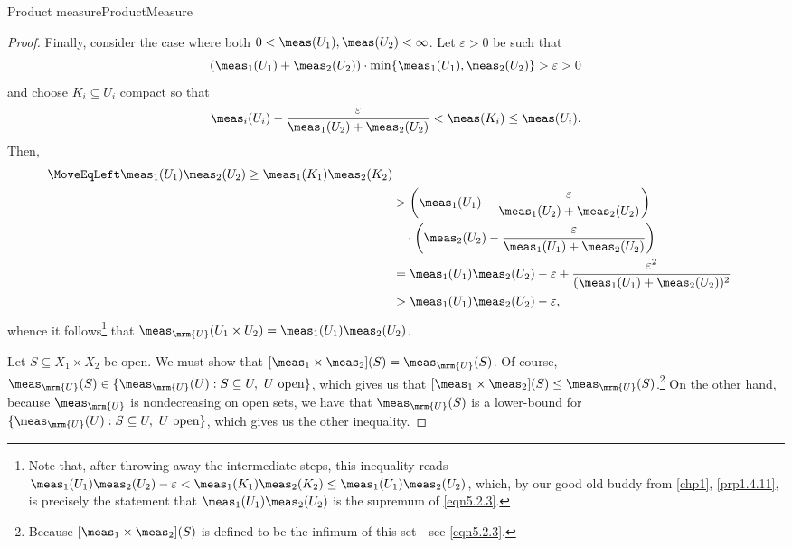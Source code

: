 \begin{thm}{Product measure}{ProductMeasure}
\begin{proof}
Finally, consider the case where both $0<\meas (U_1),\meas (U_2)<\infty$.  Let $\varepsilon >0$ be such that
\begin{equation}
(\meas _1(U_1)+\meas _2(U_2))\cdot \min \{ \meas _1(U_1),\meas _2(U_2)\} >\varepsilon >0
\end{equation}
and choose $K_i\subseteq U_i$ compact so that
\begin{equation}
\meas _i(U_i)-\frac{\varepsilon}{\meas _1(U_2)+\meas _2(U_2)}<\meas (K_i)\leq \meas (U_i).
\end{equation}
Then,
\begin{equation}\label{eqn5.2.16}
\begin{split}
\MoveEqLeft
\meas _1(U_1)\meas _2(U_2)\geq \meas _1(K_1)\meas _2(K_2) \\
& >\left( \meas _1(U_1)-\frac{\varepsilon}{\meas _1(U_2)+\meas _2(U_2)}\right) \\
& \quad \cdot \left( \meas _2(U_2)-\frac{\varepsilon}{\meas _1(U_1)+\meas _2(U_2)}\right) \\
& =\meas _1(U_1)\meas _2(U_2)-\varepsilon +\frac{\varepsilon ^2}{(\meas _1(U_1)+\meas _2(U_2))^2} \\
& >\meas _1(U_1)\meas _2(U_2)-\varepsilon ,
\end{split}
\end{equation}
whence it follows\footnote{Note that, after throwing away the intermediate steps, this inequality reads $\meas _1(U_1)\meas _2(U_2)-\varepsilon <\meas _1(K_1)\meas _2(K_2)\leq \meas _1(U_1)\meas _2(U_2)$, which, by our good old buddy from \cref{chp1}, \cref{prp1.4.11}, is precisely the statement that $\meas _1(U_1)\meas _2(U_2)$ is the supremum of \eqref{eqn5.2.3}.} that $\meas _{\mrm{U}}(U_1\times U_2)=\meas _1(U_1)\meas _2(U_2)$.

Let $S\subseteq X_1\times X_2$ be open.  We must show that $[\meas _1\times \meas _2](S)=\meas _{\mrm{U}}(S)$.  Of course, $\meas _{\mrm{U}}(S)\in \{ \meas _{\mrm{U}}(U):S\subseteq U,\ U\text{ open}\}$, which gives us that $[\meas _1\times \meas _2](S)\leq \meas _{\mrm{U}}(S)$.\footnote{Because $[\meas _1\times \meas _2](S)$ is defined to be the infimum of this set---see \eqref{eqn5.2.3}.}  On the other hand, because $\meas _{\mrm{U}}$ is nondecreasing on open sets, we have that $\meas _{\mrm{U}}(S)$ is a lower-bound for $\{ \meas _{\mrm{U}}(U):S\subseteq U,\ U\text{ open}\}$, which gives us the other inequality.


\end{proof}
\end{thm}
